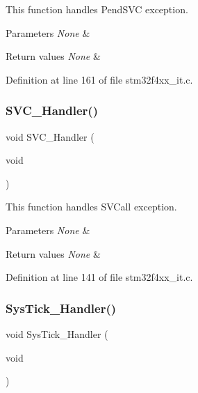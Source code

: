 This function handles Pend\+S\+VC exception. 


\begin{DoxyParams}{Parameters}
{\em None} & \\
\hline
\end{DoxyParams}

\begin{DoxyRetVals}{Return values}
{\em None} & \\
\hline
\end{DoxyRetVals}


Definition at line 161 of file stm32f4xx\+\_\+it.\+c.

\mbox{\label{group___templates_ga3e5ddb3df0d62f2dc357e64a3f04a6ce}} 
\subsubsection{\texorpdfstring{S\+V\+C\+\_\+\+Handler()}{SVC\_Handler()}}
{\footnotesize\ttfamily void S\+V\+C\+\_\+\+Handler (\begin{DoxyParamCaption}\item[{void}]{ }\end{DoxyParamCaption})}



This function handles S\+V\+Call exception. 


\begin{DoxyParams}{Parameters}
{\em None} & \\
\hline
\end{DoxyParams}

\begin{DoxyRetVals}{Return values}
{\em None} & \\
\hline
\end{DoxyRetVals}


Definition at line 141 of file stm32f4xx\+\_\+it.\+c.

\mbox{\label{group___templates_gab5e09814056d617c521549e542639b7e}} 
\subsubsection{\texorpdfstring{Sys\+Tick\+\_\+\+Handler()}{SysTick\_Handler()}}
{\footnotesize\ttfamily void Sys\+Tick\+\_\+\+Handler (\begin{DoxyParamCaption}\item[{void}]{ }\end{DoxyParamCaption})}



